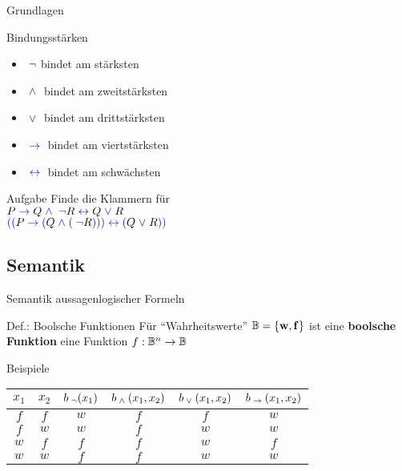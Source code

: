 \begin{frame}{Grundlagen}
	\begin{block}{Bindungsstärken}
		\begin{itemize}
			\item $\bnot$ bindet am stärksten
  			\item $\bund$ bindet am zweitstärksten
			\item $\boder$ bindet am drittstärksten
			\item $\bimp$ bindet am viertstärksten
			\item $\bgdw$ bindet am schwächsten
		\end{itemize}
	\end{block}
	\pause
	\begin{exampleblock}{Aufgabe}
		Finde die Klammern für \\
		\(	P	\bimp	Q \bund \bnot R \bgdw Q \boder R	\)\\[1ex]
		\pause
		\(	\bleftBr \bleftBr  P	\bimp	\bleftBr  Q \bund \bleftBr  \bnot R \brightBr \brightBr \brightBr \bgdw \bleftBr Q \boder R	\brightBr \brightBr \)
	\end{exampleblock}
\end{frame}

\subsection{Semantik}

\begin{frame}{Semantik aussagenlogischer Formeln}
	\begin{block}{Def.: Boolsche Funktionen}
		Für ``Wahrheitswerte'' \( \BB = \set{\mathbf{w}, \mathbf{f}} \)
		 ist eine \textbf{boolsche Funktion} eine Funktion
		 $f: \BB^n \to \BB$
	\end{block}
	\pause
	\begin{exampleblock}{Beispiele}
		\begin{center}

		  	\begin{tabular}{cc|cccc}
		    \toprule
		    $x_1$ & $x_2$ & $b_{\bnot}(x_1)$ & $b_{\bund}(x_1,x_2)$ & $b_{\boder}(x_1,x_2)$ & $b_{\bimp}(x_1,x_2)$ \\
		    \midrule
		    $f$ & $f$ & $w$ & $f$ & $f$ & $w$ \\
		    $f$ & $w$ & $w$ & $f$ & $w$ & $w$ \\
		    $w$ & $f$ & $f$ & $f$ & $w$ & $f$ \\
		    $w$ & $w$ & $f$ & $f$ & $w$ & $w$ \\
		    \bottomrule
  			\end{tabular}
		\end{center}
	\end{exampleblock}
\end{frame}

